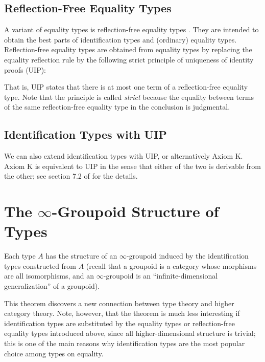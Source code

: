 \documentclass[11pt]{article}
\begin{document}
\subsection{Reflection-Free Equality Types}
A variant of equality types is reflection-free equality types \cite{sterling_et_al:LIPIcs:2019:10538}. They are intended to obtain the best parts of identification types and (ordinary) equality types. Reflection-free equality types are obtained from equality types by replacing the equality reflection rule by the following strict principle of uniqueness of identity proofs (UIP):

\begin{prooftree*}
\end{prooftree*}

That is, UIP states that there is at most one term of a reflection-free equality type.
Note that the principle is called \emph{strict} because the equality between terms of the same reflection-free equality type in the conclusion is judgmental. 

\subsection{Identification Types with UIP}

We can also extend identification types with UIP, or alternatively Axiom K. Axiom K is equivalent to UIP in the sense that either of the two is derivable from the other; see section 7.2 of \cite{hott-as:book} for the details. 

\section{The \texorpdfstring{$\infty$}{infinity}-Groupoid Structure of Types}

\begin{theorem}
Each type $A$ has the structure of an $\infty$-groupoid induced by the identification types constructed from $A$ (recall that a groupoid is a category whose morphisms are all isomorphisms, and an $\infty$-groupoid is an ``infinite-dimensional generalization'' of a groupoid).
\end{theorem}

This theorem discovers a new connection between type theory and higher category theory. Note, however, that the theorem is much less interesting if identification types are substituted by the equality types or reflection-free equality types introduced above, since all higher-dimensional structure is trivial; this is one of the main reasons why identification types are the most popular choice among types on equality.
\end{document}
